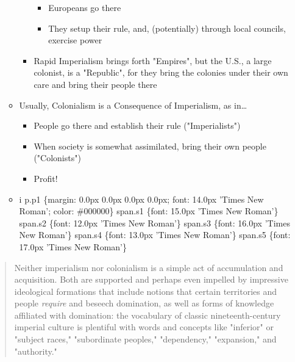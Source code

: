 \documentclass[letterpaper]{article}
\begin{document}
\begin{itemize}
\begin{itemize}
\begin{itemize}
\begin{itemize}
\item Europeans go there
\item They setup their rule, and, (potentially) through local
councils, exercise power
\end{itemize}

\item Rapid Imperialism brings forth "Empires", but the U.S., a large
colonist, is a "Republic", for they bring the colonies under their
own care and bring their people there
\end{itemize}

\item Usually, Colonialism is a Consequence of Imperialism, as in\ldots{}

\begin{itemize}
\item People go there and establish their rule ("Imperialists")
\item When society is somewhat assimilated, bring their own people
("Colonists")
\item Profit!
\end{itemize}

\item i p.p1 \{margin: 0.0px 0.0px 0.0px 0.0px; font: 14.0px 'Times New
Roman'; color: \#000000\} span.s1 \{font: 15.0px 'Times New Roman'\}
span.s2 \{font: 12.0px 'Times New Roman'\} span.s3 \{font: 16.0px
'Times New Roman'\} span.s4 \{font: 13.0px 'Times New Roman'\} span.s5
\{font: 17.0px 'Times New Roman'\}
\end{itemize}
\end{itemize}

\begin{quote}
Neither imperialism nor colonialism is a simple act of accumulation
and acquisition. Both are supported and perhaps even impelled by
impressive ideological formations that include notions that certain
territories and people \emph{require} and beseech domination, as well as
forms of knowledge affiliated with domination: the vocabulary of
classic nineteenth-century imperial culture is plentiful with words
and concepts like "inferior" or "subject races," "subordinate
peoples," "dependency," "expansion," and "authority."
\end{quote}
\end{document}
